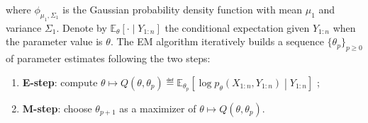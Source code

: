 where $\phi_{\mu_1,\Sigma_1}$ is the Gaussian probability density function with mean $\mu_1$ and variance $\Sigma_1$.
Denote by $\mathbb{E}_{\theta}\left[\cdot\middle|Y_{1:n}\right]$  the conditional expectation given $Y_{1:n}$ when the parameter value is $\theta$. The EM algorithm iteratively builds a sequence $\{\theta_{p}\}_{p\ge 0}$ of parameter estimates following the two steps:
\begin{enumerate}
	\item {\bf E-step}: compute $\theta \mapsto Q(\theta,\theta_{p})\eqdef \mathbb{E}_{\theta_p}\left[\log p_{\theta}(X_{1:n},Y_{1:n})\middle|Y_{1:n}\right]$ ;
	\item {\bf M-step}: choose $\theta_{p+1}$ as a maximizer of $\theta \mapsto Q(\theta,\theta_{p})$.
\end{enumerate}
